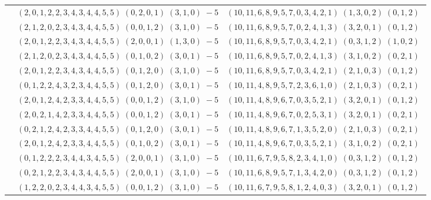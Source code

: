 \documentclass[11pt]{article}
\begin{document}
\begin{longtable}[l]{|c|c|c|}
 \cline{2-3} 
 & $(2 ,0 ,1 ,2 ,2 ,3 ,4 ,3 ,4 ,4 ,5 ,5) \;(0 ,2 ,0 ,1) \;(3 ,1 ,0) \;-5$ & $(10 ,11 ,6 ,8 ,9 ,5 ,7 ,0 ,3 ,4 ,2 ,1) \;(1 ,3 ,0 ,2) \;(0 ,1 ,2) \;$\\ 
 \cline{2-3} 
 & $(2 ,1 ,2 ,0 ,2 ,3 ,4 ,3 ,4 ,4 ,5 ,5) \;(0 ,0 ,1 ,2) \;(3 ,1 ,0) \;-5$ & $(10 ,11 ,6 ,8 ,9 ,5 ,7 ,0 ,2 ,4 ,1 ,3) \;(3 ,2 ,0 ,1) \;(0 ,1 ,2) \;$\\ 
 \cline{2-3} 
 & $(2 ,0 ,1 ,2 ,2 ,3 ,4 ,3 ,4 ,4 ,5 ,5) \;(2 ,0 ,0 ,1) \;(1 ,3 ,0) \;-5$ & $(10 ,11 ,6 ,8 ,9 ,5 ,7 ,0 ,3 ,4 ,2 ,1) \;(0 ,3 ,1 ,2) \;(1 ,0 ,2) \;$\\ 
 \cline{2-3} 
 & $(2 ,1 ,2 ,0 ,2 ,3 ,4 ,3 ,4 ,4 ,5 ,5) \;(0 ,1 ,0 ,2) \;(3 ,0 ,1) \;-5$ & $(10 ,11 ,6 ,8 ,9 ,5 ,7 ,0 ,2 ,4 ,1 ,3) \;(3 ,1 ,0 ,2) \;(0 ,2 ,1) \;$\\ 
 \cline{2-3} 
 & $(2 ,0 ,1 ,2 ,2 ,3 ,4 ,3 ,4 ,4 ,5 ,5) \;(0 ,1 ,2 ,0) \;(3 ,1 ,0) \;-5$ & $(10 ,11 ,6 ,8 ,9 ,5 ,7 ,0 ,3 ,4 ,2 ,1) \;(2 ,1 ,0 ,3) \;(0 ,1 ,2) \;$\\ 
 \cline{2-3} 
 & $(0 ,1 ,2 ,2 ,4 ,3 ,2 ,3 ,4 ,4 ,5 ,5) \;(0 ,1 ,2 ,0) \;(3 ,0 ,1) \;-5$ & $(10 ,11 ,4 ,8 ,9 ,5 ,7 ,2 ,3 ,6 ,1 ,0) \;(2 ,1 ,0 ,3) \;(0 ,2 ,1) \;$\\ 
 \cline{2-3} 
 & $(2 ,0 ,1 ,2 ,4 ,2 ,3 ,3 ,4 ,4 ,5 ,5) \;(0 ,0 ,1 ,2) \;(3 ,1 ,0) \;-5$ & $(10 ,11 ,4 ,8 ,9 ,6 ,7 ,0 ,3 ,5 ,2 ,1) \;(3 ,2 ,0 ,1) \;(0 ,1 ,2) \;$\\ 
 \cline{2-3} 
 & $(2 ,0 ,2 ,1 ,4 ,2 ,3 ,3 ,4 ,4 ,5 ,5) \;(0 ,0 ,1 ,2) \;(3 ,0 ,1) \;-5$ & $(10 ,11 ,4 ,8 ,9 ,6 ,7 ,0 ,2 ,5 ,3 ,1) \;(3 ,2 ,0 ,1) \;(0 ,2 ,1) \;$\\ 
 \cline{2-3} 
 & $(0 ,2 ,1 ,2 ,4 ,2 ,3 ,3 ,4 ,4 ,5 ,5) \;(0 ,1 ,2 ,0) \;(3 ,0 ,1) \;-5$ & $(10 ,11 ,4 ,8 ,9 ,6 ,7 ,1 ,3 ,5 ,2 ,0) \;(2 ,1 ,0 ,3) \;(0 ,2 ,1) \;$\\ 
 \cline{2-3} 
 & $(2 ,0 ,1 ,2 ,4 ,2 ,3 ,3 ,4 ,4 ,5 ,5) \;(0 ,1 ,0 ,2) \;(3 ,0 ,1) \;-5$ & $(10 ,11 ,4 ,8 ,9 ,6 ,7 ,0 ,3 ,5 ,2 ,1) \;(3 ,1 ,0 ,2) \;(0 ,2 ,1) \;$\\ 
 \cline{2-3} 
 & $(0 ,1 ,2 ,2 ,2 ,3 ,4 ,4 ,3 ,4 ,5 ,5) \;(2 ,0 ,0 ,1) \;(3 ,1 ,0) \;-5$ & $(10 ,11 ,6 ,7 ,9 ,5 ,8 ,2 ,3 ,4 ,1 ,0) \;(0 ,3 ,1 ,2) \;(0 ,1 ,2) \;$\\ 
 \cline{2-3} 
 & $(0 ,2 ,1 ,2 ,2 ,3 ,4 ,3 ,4 ,4 ,5 ,5) \;(2 ,0 ,0 ,1) \;(3 ,1 ,0) \;-5$ & $(10 ,11 ,6 ,8 ,9 ,5 ,7 ,1 ,3 ,4 ,2 ,0) \;(0 ,3 ,1 ,2) \;(0 ,1 ,2) \;$\\ 
 \cline{2-3} 
 & $(1 ,2 ,2 ,0 ,2 ,3 ,4 ,4 ,3 ,4 ,5 ,5) \;(0 ,0 ,1 ,2) \;(3 ,1 ,0) \;-5$ & $(10 ,11 ,6 ,7 ,9 ,5 ,8 ,1 ,2 ,4 ,0 ,3) \;(3 ,2 ,0 ,1) \;(0 ,1 ,2) \;$\\ 

\end{longtable}
\end{document}
